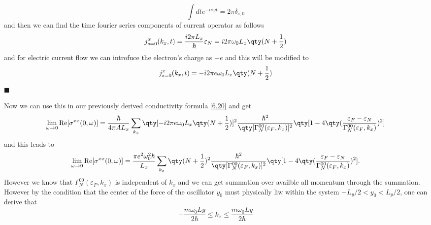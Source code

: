 \begin{equation} \label{7.12}
 \int dt e^{-is\omega t} = 2\pi \delta_{s,0}
\end{equation}
and then we can find the time fourier series components of current operator as follows
\begin{equation} \label{7.13}
 {j}^x_{s=0} (k_x,t) =
 \frac{i 2\pi L_x}{\hbar}\varepsilon_N =
 i 2\pi \omega_0 L_x \qty(N + \frac{1}{2})
\end{equation}
and for electric current flow we can introfuce the electron's charge as $-e$ and this will be modified to
\begin{equation} \label{7.14}
 {j}^x_{s=0} (k_x,t) =
 -i 2\pi e \omega_0 L_x \qty(N + \frac{1}{2})
\end{equation}
\hfill$\blacksquare$

\noindent
Now we can use this in our previously derived conductivity formula \eqref{6.20} and get
\begin{equation} \label{7.15}
  \begin{aligned}
    \lim_{\omega \to 0}
    \text{Re}[{\sigma}^{xx}(0,\omega)] =
    \frac{\hbar}{4\pi A L_x}
    \sum_{{k_x}}
    \qty[-i 2\pi e \omega_0 L_x \qty(N + \frac{1}{2})]^2
    \frac{\hbar^2}
    {\qty[\Gamma^{00}_{N}(\varepsilon_F,k_x)]^2}
    \qty[
      1 -
      4\qty(\frac{{\varepsilon_F}-{\varepsilon_N}}{\Gamma^{00}_{N}(\varepsilon_F,k_x)})^2
    ]
  \end{aligned}
\end{equation}
and this leads to
\begin{equation} \label{7.16}
  \begin{aligned}
    \lim_{\omega \to 0}
    \text{Re}[{\sigma}^{xx}(0,\omega)] =
    \frac{\pi e^2 \omega_0^2 \hbar}{L_x}
    \sum_{{k_x}}
    \qty(N + \frac{1}{2})^2
    \frac{\hbar^2}
    {\qty[\Gamma^{00}_{N}(\varepsilon_F,k_x)]^2}
    \qty[
      1 -
      4\qty(\frac{{\varepsilon_F}-{\varepsilon_N}}{\Gamma^{00}_{N}(\varepsilon_F,k_x)})^2
    ].
  \end{aligned}
\end{equation}
However we know that $\Gamma^{00}_{N}(\varepsilon_F,k_x)$ is independent of $k_x$ and we can get summation over availble all momentum through the summation. However by the condition that the center of the force of the oscillator $y_0$ must physically liw within the system $-L_y/2 < y_0 < L_y/2$, one can derive that
\begin{equation} \label{7.17}
 -\frac{m\omega_0 Ly}{2\hbar} \leq k_x \leq \frac{m\omega_0 Ly}{2\hbar}
\end{equation}
